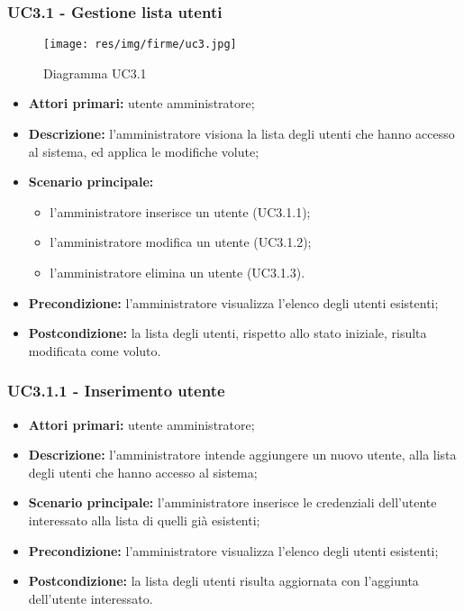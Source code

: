 \subsubsection{UC3.1 - Gestione lista utenti}
	\begin{center}
		\begin{figure}[h!]
			\texttt{[image: res/img/firme/uc3.jpg]}
			\caption{Diagramma UC3.1}
		\end{figure}
	\end{center}
	\begin{itemize}
		\item \textbf{Attori primari:} utente amministratore;
		\item \textbf{Descrizione:} l'amministratore visiona la lista degli utenti che hanno accesso al sistema, ed applica le modifiche volute;
		\item \textbf{Scenario principale:} 
			\begin{itemize}
				\item l'amministratore inserisce un utente (UC3.1.1);
				\item l'amministratore modifica un utente (UC3.1.2);
				\item l'amministratore elimina un utente (UC3.1.3).
			\end{itemize}
		\item \textbf{Precondizione:} l'amministratore visualizza l'elenco degli utenti esistenti;
		\item \textbf{Postcondizione:} la lista degli utenti, rispetto allo stato iniziale, risulta modificata come voluto.
	\end{itemize}

\subsubsection{UC3.1.1 - Inserimento utente}
\begin{itemize}
	\item \textbf{Attori primari:} utente amministratore;
	\item \textbf{Descrizione:} l'amministratore intende aggiungere un nuovo utente, alla lista degli utenti che hanno accesso al sistema;
	\item \textbf{Scenario principale:} l'amministratore inserisce le credenziali dell'utente interessato alla lista di quelli già esistenti;
	\item \textbf{Precondizione:} l'amministratore visualizza l'elenco degli utenti esistenti;
	\item \textbf{Postcondizione:} la lista degli utenti risulta aggiornata con l'aggiunta dell'utente interessato.
\end{itemize}

